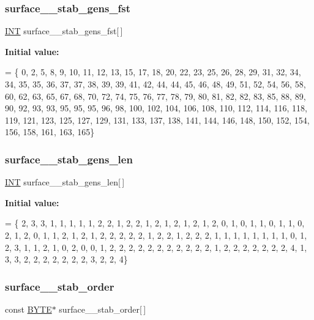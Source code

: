 \subsubsection{\texorpdfstring{surface\+\_\+\_\+stab\+\_\+gens\+\_\+fst}{surface\_41\_stab\_gens\_fst}}
{\footnotesize\ttfamily \mbox{\hyperlink{galois_8h_a09fddde158a3a20bd2dcadb609de11dc}{I\+NT}} surface\+\_\+\_\+stab\+\_\+gens\+\_\+fst\mbox{[}$\,$\mbox{]}}

{\bfseries Initial value\+:}
\begin{DoxyCode}
= \{ 0, 2, 5, 8, 9, 10, 11, 12, 13, 15, 
    17, 18, 20, 22, 23, 25, 26, 28, 29, 31, 
    32, 34, 34, 35, 35, 36, 37, 37, 38, 39, 
    39, 41, 42, 44, 44, 45, 46, 48, 49, 51, 
    52, 54, 56, 58, 60, 62, 63, 65, 67, 68, 
    70, 72, 74, 75, 76, 77, 78, 79, 80, 81, 
    82, 82, 83, 85, 88, 89, 90, 92, 93, 93, 
    95, 95, 95, 96, 98, 100, 102, 104, 106, 108, 
    110, 112, 114, 116, 118, 119, 121, 123, 125, 127, 
    129, 131, 133, 137, 138, 141, 144, 146, 148, 150, 
    152, 154, 156, 158, 161, 163, 165\}
\end{DoxyCode}
\mbox{\label{surface__41_8_c_a50c1264d669d60fb5246fdaa553dd96d}} 
\subsubsection{\texorpdfstring{surface\+\_\+\_\+stab\+\_\+gens\+\_\+len}{surface\_41\_stab\_gens\_len}}
{\footnotesize\ttfamily \mbox{\hyperlink{galois_8h_a09fddde158a3a20bd2dcadb609de11dc}{I\+NT}} surface\+\_\+\_\+stab\+\_\+gens\+\_\+len\mbox{[}$\,$\mbox{]}}

{\bfseries Initial value\+:}
\begin{DoxyCode}
= \{ 2, 3, 3, 1, 1, 1, 1, 1, 2, 2, 
    1, 2, 2, 1, 2, 1, 2, 1, 2, 1, 
    2, 0, 1, 0, 1, 1, 0, 1, 1, 0, 
    2, 1, 2, 0, 1, 1, 2, 1, 2, 1, 
    2, 2, 2, 2, 2, 1, 2, 2, 1, 2, 
    2, 2, 1, 1, 1, 1, 1, 1, 1, 1, 
    0, 1, 2, 3, 1, 1, 2, 1, 0, 2, 
    0, 0, 1, 2, 2, 2, 2, 2, 2, 2, 
    2, 2, 2, 2, 1, 2, 2, 2, 2, 2, 
    2, 2, 4, 1, 3, 3, 2, 2, 2, 2, 
    2, 2, 2, 3, 2, 2, 4\}
\end{DoxyCode}
\mbox{\label{surface__41_8_c_a834534f74921072c78c7a682ac12512c}} 
\subsubsection{\texorpdfstring{surface\+\_\+\_\+stab\+\_\+order}{surface\_41\_stab\_order}}
{\footnotesize\ttfamily const \mbox{\hyperlink{galois_8h_ab6cc7b4aeb6ea31aba2b3fbfc83ff5e6}{B\+Y\+TE}}$\ast$ surface\+\_\+\_\+stab\+\_\+order\mbox{[}$\,$\mbox{]}}

